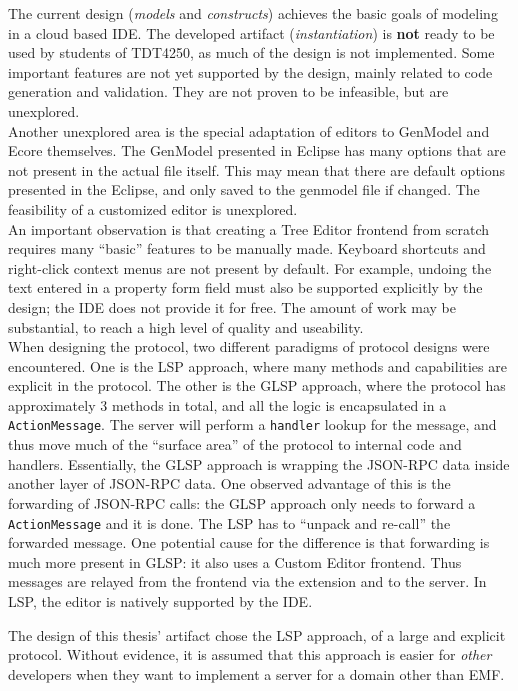 
The current design (\textit{models} and \textit{constructs}) achieves the basic goals of modeling in a \gls{cloud} based \acrshort{IDE}.
The developed artifact (\textit{instantiation}) is \textbf{not} ready to be used by students of \gls{TDT4250}, as much of the design is not implemented.
Some important features are not yet supported by the design, mainly related to code generation and validation.
They are not proven to be infeasible, but are unexplored. \\

Another unexplored area is the special adaptation of editors to GenModel and Ecore themselves.
The GenModel presented in \gls{Eclipse} has many options that are not present in the actual file itself.
This may mean that there are default options presented in the \gls{Eclipse}, and only saved to the genmodel file if changed.
The feasibility of a customized editor is unexplored. \\

An important observation is that creating a Tree Editor frontend from scratch requires many ``basic'' features to be manually made.
Keyboard shortcuts and right-click context menus are not present by default.
For example, undoing the text entered in a property form field must also be supported explicitly by the design; the \acrshort{IDE} does not provide it for free.
The amount of work may be substantial, to reach a high level of quality and useability.\\

When designing the protocol, two different paradigms of protocol designs were encountered.
One is the \acrshort{LSP} approach, where many methods and capabilities are explicit in the protocol.
The other is the \acrshort{GLSP} approach, where the protocol has approximately 3 methods in total, and all the logic is encapsulated in a \texttt{ActionMessage}.
The server will perform a \texttt{handler} lookup for the message, and thus move much of the ``surface area'' of the protocol to internal code and handlers.
Essentially, the \acrshort{GLSP} approach is wrapping the \gls{JSON-RPC} data inside another layer of \gls{JSON-RPC} data.
One observed advantage of this is the forwarding of \gls{JSON-RPC} calls: the \acrshort{GLSP} approach only needs to forward a \texttt{ActionMessage} and it is done.
The \acrshort{LSP} has to ``unpack and re-call'' the forwarded message.
One potential cause for the difference is that forwarding is much more present in \acrshort{GLSP}: it also uses a Custom Editor frontend.
Thus messages are relayed from the frontend via the extension and to the server.
In \acrshort{LSP}, the editor is natively supported by the \acrshort{IDE}.

The design of this thesis' artifact chose the \acrshort{LSP} approach, of a large and explicit protocol.
Without evidence, it is assumed that this approach is easier for \textit{other} developers when they want to implement a server for a domain other than \acrshort{EMF}.